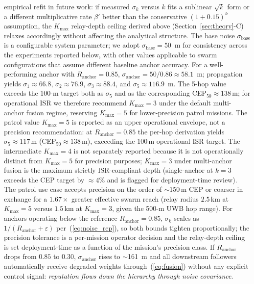\documentclass[journal,10pt,twocolumn]{IEEEtran}
\begin{document}
empirical refit in future work: if measured $\sigma_k$ versus $k$ fits a sublinear $\sqrt{k}$ form or a different multiplicative rate $\beta'$ better than the conservative $(1+0.15)^k$ assumption, the $K_\text{max}$ relay-depth ceiling derived above (Section~\ref{sec:theory}-C) relaxes accordingly without affecting the analytical structure. The base noise $\sigma_\text{base}$ is a configurable system parameter; we adopt $\sigma_\text{base} = 50$~m for consistency across the experiments reported below, with other values applicable to swarm configurations that assume different baseline anchor accuracy. For a well-performing anchor with $R_\text{anchor} = 0.85$, $\sigma_\text{anchor} = 50/0.86 \approx 58.1$~m; propagation yields $\sigma_1 \approx 66.8$, $\sigma_2 \approx 76.9$, $\sigma_3 \approx 88.4$, and $\sigma_5 \approx 116.9$~m. The 5-hop value exceeds the 100-m target both as $\sigma_5$ and as the corresponding CEP$_{50}\approx 138$\,m; for operational ISR we therefore recommend $K_\text{max}=3$ under the default multi-anchor fusion regime, reserving $K_\text{max}=5$ for lower-precision patrol missions. The patrol value $K_\text{max}=5$ is reported as an upper operational envelope, not a precision recommendation: at $R_\text{anchor}=0.85$ the per-hop derivation yields $\sigma_5 \approx 117$\,m (CEP$_{50}\approx 138$\,m), exceeding the 100\,m operational ISR target. The intermediate $K_\text{max}=4$ is not separately reported because it is not operationally distinct from $K_\text{max}=5$ for precision purposes; $K_\text{max}=3$ under multi-anchor fusion is the maximum strictly ISR-compliant depth (single-anchor at $k=3$ exceeds the CEP target by $\approx 4\%$ and is flagged for deployment-time review). The patrol use case accepts precision on the order of $\sim 150$\,m CEP or coarser in exchange for a $1.67\times$ greater effective swarm reach (relay radius $2.5$\,km at $K_\text{max}=5$ versus $1.5$\,km at $K_\text{max}=3$, given the 500-m UWB hop range). For anchors operating below the reference $R_\text{anchor}=0.85$, $\sigma_k$ scales as $1/(R_\text{anchor}+\varepsilon)$ per~(\ref{eq:noise_rep}), so both bounds tighten proportionally; the precision tolerance is a per-mission operator decision and the relay-depth ceiling is set deployment-time as a function of the mission's precision class. If $R_\text{anchor}$ drops from $0.85$ to $0.30$, $\sigma_\text{anchor}$ rises to $\sim$161~m and all downstream followers automatically receive degraded weights through~(\ref{eq:fusion}) without any explicit control signal: \emph{reputation flows down the hierarchy through noise covariance}.
\end{document}
